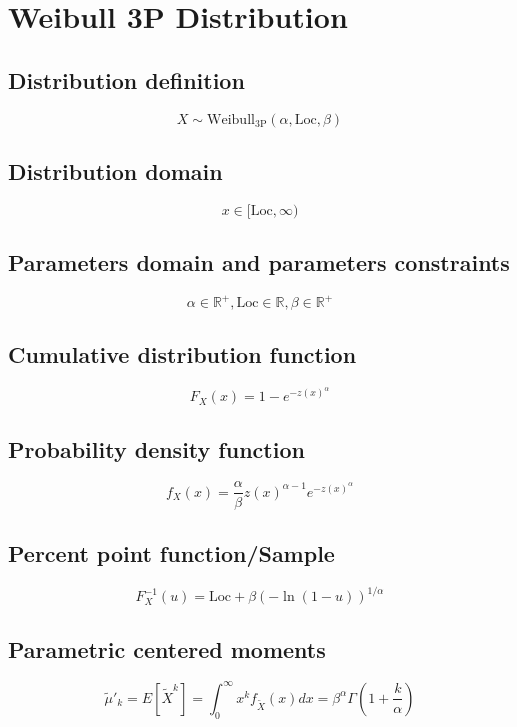 \documentclass{article}
\begin{document}
\newpage
\section{Weibull 3P Distribution}
\subsection{Distribution definition}
\begin{equation*} X\sim\mathrm{Weibull_{3P}}\left(\alpha,\text{Loc},\beta\right) \end{equation*}
\subsection{Distribution domain}
\begin{equation*} x\in [\text{Loc},\infty) \end{equation*}
\subsection{Parameters domain and parameters constraints}
\begin{equation*} \alpha\in\mathbb{R}^{+}, \text{Loc}\in\mathbb{R}, \beta\in\mathbb{R}^{+} \end{equation*}
\subsection{Cumulative distribution function}
\begin{equation*} F_{X}\left(x\right)=1-e^{-z(x)^\alpha} \end{equation*}
\subsection{Probability density function}
\begin{equation*} f_{X}\left(x\right)=\frac{\alpha}{\beta}z(x)^{\alpha-1}e^{-z(x)^\alpha} \end{equation*}
\subsection{Percent point function/Sample}
\begin{equation*} F^{-1}_{X}\left(u\right)=\text{Loc}+\beta(-\ln(1-u))^{1/\alpha} \end{equation*}
\subsection{Parametric centered moments}
\begin{equation*} \tilde{\mu}'_{k}=E[\tilde{X}^k]=\int_{0}^{\infty}x^{k}f_{\tilde{X}}\left(x\right)dx=\beta^\alpha \Gamma\left(1+\frac{k}{\alpha}\right) \end{equation*}
\end{document}
